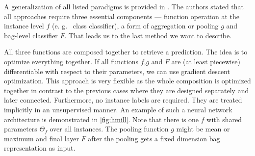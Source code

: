 A generalization of all listed paradigms is provided in \cite{Mandlik2020}. The authors stated that all approaches require three essential components --- function operation at the instance level $f$ (e. g. \ class classifier), a form of aggregation or pooling $g$ and bag-level classifier $F$. That leads us to the last method we want to describe.

All three functions are composed together to retrieve a prediction. The idea is to optimize everything together. If all functions $f$,$g$ and $F$ are (at least piecewise) differentiable with respect to their parameters, we can use gradient descent optimization. \cite{Pevny2016a, Edwards2017} This approach is very flexible as the whole composition is optimized together in contrast to the previous cases where they are designed separately and later connected. Furthermore, no instance labels are required. They are treated implicitly in an unsupervised manner. An example of such a neural network architecture is demonstrated in \ref{fig:hmill}. Note that there is one $f$ with shared parameters $\Theta_{f}$ over all instances. The pooling function $g$ might be mean or maximum and final layer $F$ after the pooling gets a fixed dimension bag representation as input.

